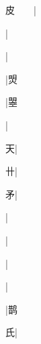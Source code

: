 \begin{multicols}{2}
{{\cjk{}皮{\cnsym{}　}{\cnsym{}　}}|{}\par
{\cjk{}{\cnsym{}　}{\cnsym{}　}{\cnsym{}　}}|{}\par
{\cjk{}{\cnsym{}　}{\cnsym{}　}{\cnsym{}　}}|{}\par
{\cjk{}{\cnsym{}　}{\cnsym{}　}{\cnsym{}　}}|{\cjk{}焽}\par
{\cjk{}{\cnsym{}　}{\cnsym{}　}{\cnsym{}　}}|{\cjk{}曌}\par
{\cjk{}{\cnsym{}　}{\cnsym{}　}{\cnsym{}　}}|{}\par
{\cjk{}{\cnsym{}　}{\cnsym{}　}天}|{}\par
{\cjk{}{\cnsym{}　}{\cnsym{}　}卄}|{}\par
{\cjk{}{\cnsym{}　}{\cnsym{}　}矛}|{}\par
{\cjk{}{\cnsym{}　}{\cnsym{}　}{\cnsym{}　}}|{}\par
{\cjk{}{\cnsym{}　}{\cnsym{}　}{\cnsym{}　}}|{}\par
{\cjk{}{\cnsym{}　}{\cnsym{}　}{\cnsym{}　}}|{}\par
{\cjk{}{\cnsym{}　}{\cnsym{}　}{\cnsym{}　}}|{}\par
{}|{\cjk{}鹊}\par
{\cjk{}{\cnsym{}　}{\cnsym{}　}氏}|{}\par
}
\end{multicols}
